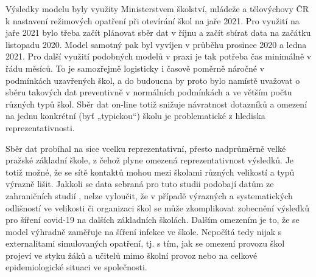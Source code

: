 Výsledky modelu byly využity Ministerstvem školství, mládeže a tělovýchovy ČR k nastavení režimových opatření při otevírání škol na jaře 2021. Pro využití na jaře 2021 bylo třeba začít plánovat sběr dat v říjnu a začít sbírat data na začátku listopadu 2020. Model samotný pak byl vyvíjen v průběhu prosince 2020 a ledna 2021. Pro další využití podobných modelů v praxi je tak potřeba čas minimálně v řádu měsíců. To je samozřejmě logisticky i časově poměrně náročné v podmínkách uzavřených škol, a do budoucna by proto bylo namístě uvažovat o sběru takových dat preventivně v normálních podmínkách a ve větším počtu různých typů škol. Sběr dat on-line totiž snižuje návratnost dotazníků a omezení na jednu konkrétní (byť „typickou“) školu je problematické z hlediska reprezentativnosti.

Sběr dat probíhal na sice vcelku reprezentativní, přesto nadprůměrně velké pražské základní škole, z čehož plyne omezená reprezentativnost výsledků. Je totiž možné, že se sítě kontaktů mohou mezi školami různých velikostí a typů výrazně lišit. Jakkoli se data sebraná pro tuto studii podobají datům ze zahraničních studií \cite{gemmetto2014mitigation, mcgee2021model, stehle2011high}, nelze vyloučit, že v případě výrazných a systematických odlišností ve velikosti či organizaci škol se může zkomplikovat zobecnění výsledků pro šíření covid-19 na dalších základních školách. Dalším omezením je to, že se model výhradně zaměřuje na šíření infekce ve škole. Nepočítá tedy nijak s externalitami simulovaných opatření, tj. s tím, jak se omezení provozu škol projeví ve styku žáků a učitelů mimo školní provoz nebo na celkové epidemiologické situaci ve společnosti.









